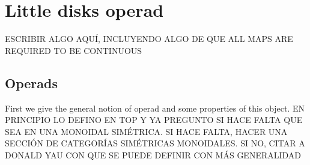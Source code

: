 \documentclass[TFM.tex]{subfiles}
\begin{document}
\chapter{Little disks operad}

ESCRIBIR ALGO AQUÍ, INCLUYENDO ALGO DE QUE ALL MAPS ARE REQUIRED TO BE CONTINUOUS


\section{Operads}
First we give the general notion of operad and some properties of this object. EN PRINCIPIO LO DEFINO EN TOP Y YA PREGUNTO SI HACE FALTA QUE SEA EN UNA MONOIDAL SIMÉTRICA. SI HACE FALTA, HACER UNA SECCIÓN DE CATEGORÍAS SIMÉTRICAS MONOIDALES. SI NO, CITAR A DONALD YAU CON QUE SE PUEDE DEFINIR CON MÁS GENERALIDAD
\end{document}
